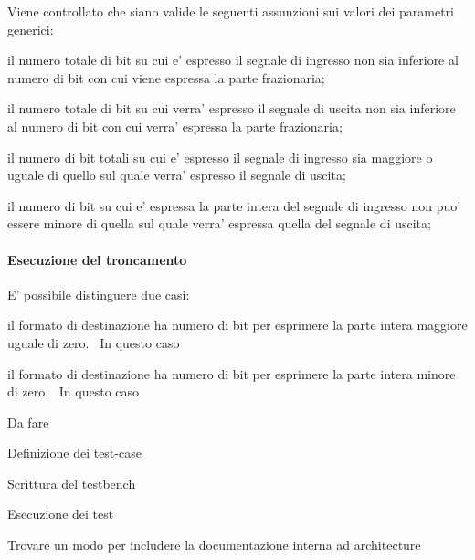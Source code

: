 Viene controllato che siano valide le seguenti assunzioni sui valori dei parametri generici\+:
\begin{DoxyItemize}
\item il numero totale di bit su cui e' espresso il segnale di ingresso non sia inferiore al numero di bit con cui viene espressa la parte frazionaria;
\item il numero totale di bit su cui verra' espresso il segnale di uscita non sia inferiore al numero di bit con cui verra' espressa la parte frazionaria;
\item il numero di bit totali su cui e' espresso il segnale di ingresso sia maggiore o uguale di quello sul quale verra' espresso il segnale di uscita;
\item il numero di bit su cui e' espressa la parte intera del segnale di ingresso non puo' essere minore di quella sul quale verra' espressa quella del segnale di uscita;
\end{DoxyItemize}

\paragraph*{Esecuzione del troncamento}

E' possibile distinguere due casi\+:
\begin{DoxyEnumerate}
\item il formato di destinazione ha numero di bit per esprimere la parte intera maggiore uguale di zero.~\newline
 In questo caso
\item il formato di destinazione ha numero di bit per esprimere la parte intera minore di zero.~\newline
 In questo caso
\end{DoxyEnumerate}

\begin{DoxyRefDesc}{Da fare}
\item[\hyperlink{todo__todo000001}{Da fare}]
\begin{DoxyItemize}
\item Definizione dei test-\/case
\item Scrittura del testbench
\item Esecuzione dei test
\item Trovare un modo per includere la documentazione interna ad architecture 
\end{DoxyItemize}\end{DoxyRefDesc}


